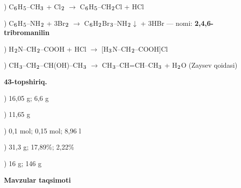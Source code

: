 \documentclass[11pt,a4paper]{article}
\renewcommand{\textsubscript}[1]{\ensuremath{_{\text{\fontsize{8}{8}\selectfont #1}}}}
\begin{document}
) C\textsubscript{6}H\textsubscript{5}--CH\textsubscript{3} + Cl\textsubscript{2} $\to$ C\textsubscript{6}H\textsubscript{5}--CH\textsubscript{2}Cl + HCl\par
{}) C\textsubscript{6}H\textsubscript{5}--NH\textsubscript{2} + 3Br\textsubscript{2} $\to$ C\textsubscript{6}H\textsubscript{2}Br\textsubscript{3}--NH\textsubscript{2}$\downarrow$ + 3HBr --- nomi: \textbf{2,4,6-tribromanilin}\par
{}) H\textsubscript{2}N--CH\textsubscript{2}--COOH + HCl $\to$ [H\textsubscript{3}N--CH\textsubscript{2}--COOH]Cl\par
{}) CH\textsubscript{3}--CH\textsubscript{2}--CH(OH)--CH\textsubscript{3} $\to$ CH\textsubscript{3}--CH=CH--CH\textsubscript{3} + H\textsubscript{2}O (Zaysev qoidasi)\par
\noindent\textbf{43-topshiriq.}\par
{}) 16,05 g; 6,6 g\par
{}) 11,65 g\par
{}) 0,1 mol; 0,15 mol; 8,96 l\par
{}) 31,3 g; 17,89\%; 2,22\%\par
{}) 16 g; 146 g\par
\par\bigskip\noindent\textbf{Mavzular taqsimoti}\par\smallskip
\end{document}
